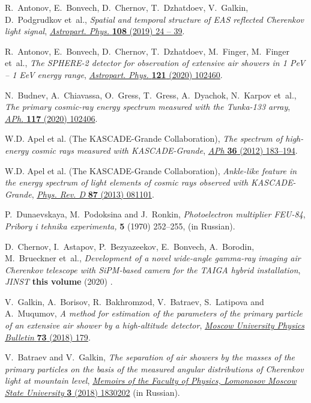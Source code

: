 \documentclass[a4paper,11pt]{article}
\begin{document}
\begin{thebibliography}{10}
R.~Antonov, E.~Bonvech, D.~Chernov, T.~Dzhatdoev, V.~Galkin, D.~Podgrudkov  et~al., \emph{Spatial and temporal structure of EAS reflected Cherenkov light signal}, \href{http://dx.doi.org/10.1016/j.astropartphys.2019.01.002}{\emph{Astropart. Phys.} {\bfseries 108} (2019) 24 -- 39}.

R.~Antonov, E.~Bonvech, D.~Chernov, T.~Dzhatdoev, M.~Finger, M.~Finger et~al., \emph{The SPHERE-2 detector for observation of extensive air showers in 1 PeV -- 1 EeV energy range}, \href{http://dx.doi.org/10.1016/j.astropartphys.2020.102460}{\emph{Astropart. Phys.} {\bfseries 121} (2020) 102460}.

N.~Budnev, A.~Chiavassa, O.~Gress, T.~Gress, A.~Dyachok, N.~Karpov et~al., \emph{The primary cosmic-ray energy spectrum measured with the Tunka-133 array}, \href{http://dx.doi.org/10.1016/j.astropartphys.2019.102406}{\emph{APh.} {\bfseries 117} (2020) 102406}.

{W.D. Apel et al. (The KASCADE-Grande Collaboration)}, \emph{{The spectrum of high-energy cosmic rays measured with KASCADE-Grande}}, \href{https://doi.org/10.1016/j.astropartphys.2012.05.023}{{\emph{APh} {\bfseries 36} (2012) 183--194}}.

{W.D. Apel et al. (The KASCADE-Grande Collaboration)}, \emph{Ankle-like feature in the energy spectrum of light elements of cosmic rays observed with KASCADE-Grande}, \href{https://doi.org/10.1103/PhysRevD.87.081101}{{\emph{Phys. Rev. D} {\bfseries 87} (2013) 081101}}.

P.~Dunaevskaya, M.~Podoksina and J.~Ronkin, \emph{Photoelectron multiplier FEU-84}, {\emph{Pribory i tehnika experimenta,} {\bfseries 5} (1970) 252--255},  (in Russian).

D.~Chernov, I.~Astapov, P.~Bezyazeekov, E.~Bonvech, A.~Borodin, M.~Brueckner et~al., \emph{Development of a novel wide-angle gamma-ray imaging air Cherenkov telescope with SiPM-based camera for the TAIGA hybrid installation}, {\emph{JINST} {\bfseries this volume} (2020) }.

V.~Galkin, A.~Borisov, R.~Bakhromzod, V.~Batraev, S.~Latipova and A.~Muqumov, \emph{A method for estimation of the parameters of the primary particle of an extensive air shower by a high-altitude detector}, \href{http://dx.doi.org/10.3103/S0027134918020078}{\emph{Moscow University Physics Bulletin} {\bfseries 73} (2018) 179}.

V.~Batraev and V.~Galkin, \emph{The separation of air showers by the masses of the primary particles on the basis of the measured angular distributions of Cherenkov light at mountain level}, \href{http://uzmu.phys.msu.ru/file/2018/3/1830202.pdf}{\emph{Memoirs of the Faculty of Physics, Lomonosov Moscow State University} {\bfseries 3} (2018) 1830202} (in Russian).


\end{thebibliography}
\end{document}
